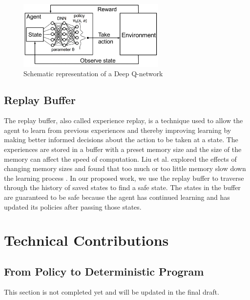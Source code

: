 \documentclass[acmsmall,review,authorversion]{acmart}
\begin{document}
    \begin{figure}[ht]
        \centering
        \includegraphics[width=0.65\textwidth]{assets/dqn.png}
        \caption{Schematic representation of a Deep Q-network}
        \label{fig:DQ_schem}
    \end{figure}

\subsection{Replay Buffer}
The replay buffer, also called experience replay, is a technique used to allow the agent to learn from previous experiences and thereby improving learning by making better informed decisions about the action to be taken at a state. The experiences are stored in a buffer with a preset memory size and the size of the memory can affect the speed of computation. Liu et al. explored the effects of changing memory sizes and found that too much or too little memory slow down the learning process \cite{DBLP:journals/corr/abs-1710-06574}. In our proposed work, we use the replay buffer to traverse through the history of saved states to find a safe state. The states in the buffer are guaranteed to be safe because the agent has continued learning and has updated its policies after passing those states.



\section{Technical Contributions}
\subsection{From Policy to Deterministic Program}
This section is not completed yet and will be updated in the final draft.
\end{document}
